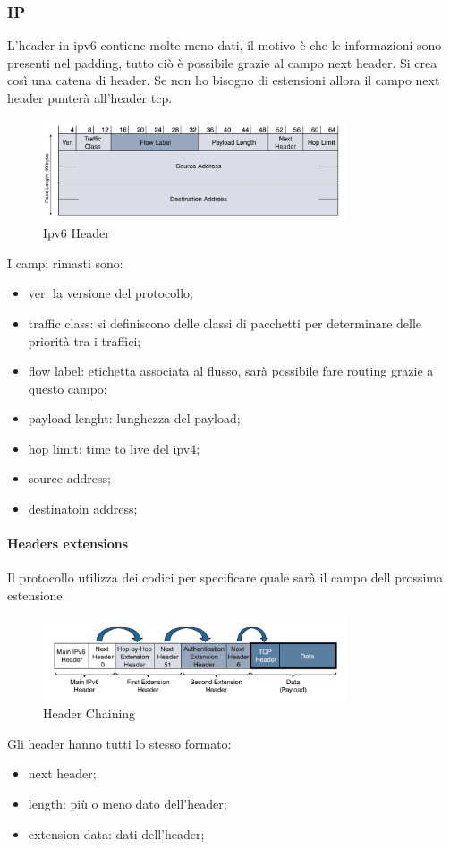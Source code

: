 \documentclass[12pt]{article}
\begin{document}
\subsubsection{IP}
L'header in ipv6 contiene molte meno dati, il motivo \`e che le informazioni sono presenti nel padding, tutto ci\`o \`e possibile grazie al campo next header. Si crea cos\`i una catena di header. Se non ho bisogno di estensioni allora il campo next header punter\`a all'header tcp.
\begin{figure}[H]
    \centering
    \includegraphics[width=0.8\textwidth]{ipv6-header.png}
    \caption{Ipv6 Header}
    \label{fig:ipv6-header}
\end{figure}
I campi rimasti sono:
\begin{itemize}
    \item ver: la versione del protocollo;
    \item traffic class: si definiscono delle classi di pacchetti per determinare delle priorit\`a tra i traffici;
    \item flow label: etichetta associata al flusso, sar\`a possibile fare routing grazie a questo campo;
    \item payload lenght: lunghezza del payload;
    \item hop limit: time to live del ipv4;
    \item source address;
    \item destinatoin address;
\end{itemize}

\paragraph{Headers extensions}
Il protocollo utilizza dei codici per specificare quale sar\`a il campo dell prossima estensione.
\begin{figure}[H]
    \centering
    \includegraphics[width=0.8\textwidth]{header-chaining.png}
    \caption{Header Chaining}
    \label{fig:header-chaining}
\end{figure}
Gli header hanno tutti lo stesso formato:
\begin{itemize}
    \item next header;
    \item length: pi\`u o meno dato dell'header;
    \item extension data: dati dell'header;
\end{itemize}
\end{document}
